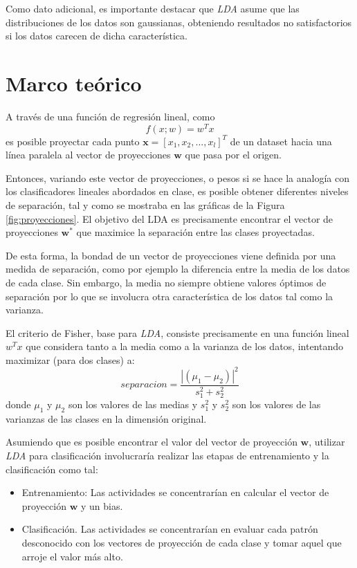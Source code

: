 \documentclass[journal]{IEEEtran}
\begin{document}
Como dato adicional, es importante destacar que \emph{LDA} asume que las distribuciones de los datos son gaussianas, obteniendo resultados no satisfactorios si los datos carecen de dicha característica.

\section{Marco teórico}
A través de una función de regresión lineal, como $$f(x;w) = w^Tx$$ es posible proyectar cada punto $\mathbf{x} = [x_1,x_2,...,x_l]^T$ de un dataset hacia una línea paralela al vector de proyecciones $\mathbf{w}$ que pasa por el origen.

Entonces, variando este vector de proyecciones, o pesos si se hace la analogía con los clasificadores lineales abordados en clase, es posible obtener diferentes niveles de separación, tal y como se mostraba en las gráficas de la Figura \ref{fig:proyecciones}.
El objetivo del LDA es precisamente encontrar el vector de proyecciones $\mathbf{w^*}$ que maximice la separación entre las clases proyectadas.

De esta forma, la bondad de un vector de proyecciones viene definida por una medida de separación, como por ejemplo la diferencia entre la media de los datos de cada clase.
Sin embargo, la media no siempre obtiene valores óptimos de separación por lo que se involucra otra característica de los datos tal como la varianza.

El criterio de Fisher, base para \emph{LDA}, consiste precisamente en una función lineal $w^Tx$ que considera tanto a la media como a la varianza de los datos, intentando maximizar (para dos clases) a:
\begin{equation}
separacion= \frac{|( \mu_1 - \mu_2 ) |^2}{s_1^2 + s_2^2} \label{eq:criterio-fisher}
\end{equation}
donde $\mu_1$ y $\mu_2$ son los valores de las medias y $s_1^2$ y $s_2^2$ son los valores de las varianzas de las clases en la dimensión original.

Asumiendo que es posible encontrar el valor del vector de proyección $\mathbf{w}$, utilizar \emph{LDA} para clasificación involucraría realizar las etapas de entrenamiento y la clasificación como tal:
\begin{itemize}
	\item Entrenamiento: Las actividades se concentrarían en calcular el vector de proyección $\mathbf{w}$ y un bias.
	\item Clasificación. Las actividades se concentrarían en evaluar cada patrón desconocido con los vectores de proyección de cada clase y tomar aquel que arroje el valor más alto.
\end{itemize}
\end{document}
